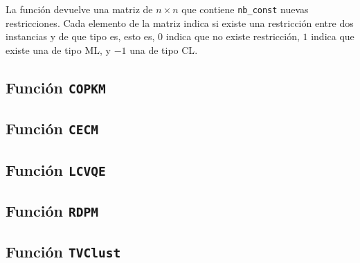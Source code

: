 La función devuelve una matriz de $n \times n$ que contiene \texttt{nb\_const} nuevas restricciones. Cada elemento de la matriz indica si existe una restricción entre dos instancias y de que tipo es, esto es, $0$ indica que no existe restricción, $1$ indica que existe una de tipo \acs{ML}, y $-1$ una de tipo \acs{CL}.

\subsection{Función \texttt{COPKM}}


\subsection{Función \texttt{CECM}}


\subsection{Función \texttt{LCVQE}}


\subsection{Función \texttt{RDPM}}


\subsection{Función \texttt{TVClust}}









